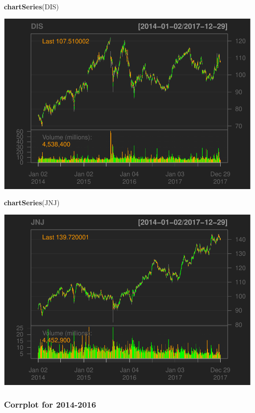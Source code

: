 \documentclass[]{article}
\newenvironment{Shaded}{\begin{snugshade}}{\end{snugshade}}
\newcommand{\KeywordTok}[1]{\textcolor[rgb]{0.13,0.29,0.53}{\textbf{#1}}}
\newcommand{\NormalTok}[1]{#1}
\begin{document}
\begin{Shaded}
\begin{Highlighting}[]
\KeywordTok{chartSeries}\NormalTok{(DIS)}
\end{Highlighting}
\end{Shaded}

\includegraphics{Markowitz_Research_Me_files/figure-latex/unnamed-chunk-3-3.pdf}

\begin{Shaded}
\begin{Highlighting}[]
\KeywordTok{chartSeries}\NormalTok{(JNJ)}
\end{Highlighting}
\end{Shaded}

\includegraphics{Markowitz_Research_Me_files/figure-latex/unnamed-chunk-3-4.pdf}

\subsubsection{Corrplot for 2014-2016}\label{corrplot-for-2014-2016}
\end{document}
